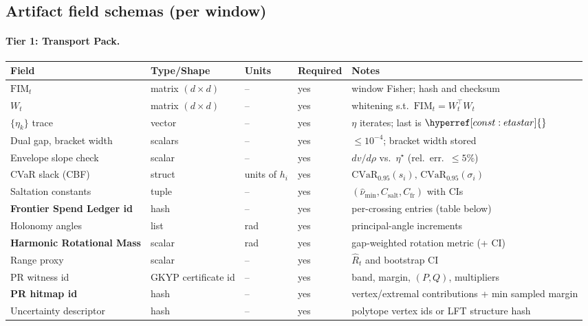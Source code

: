 \documentclass[10pt]{article}
\newcommand{\FIM}{\mathrm{FIM}}
\newcommand{\constref}[1]{\hyperref[const:#1]{\ensuremath{\csname constsym#1\endcsname}}}
\begin{document}
\subsection{Artifact field schemas (per window)}\label{app:artifact-schemas}

\paragraph{Tier 1: Transport Pack.}
\begin{center}
\renewcommand{\arraystretch}{1.12}
\begin{tabularx}{\textwidth}{@{} l l l X X @{}}
\toprule
\textbf{Field} & \textbf{Type/Shape} & \textbf{Units} & \textbf{Required} & \textbf{Notes} \\
\midrule
$\FIM_t$ & matrix $(d\times d)$ & – & yes & window Fisher; hash and checksum \\
$W_t$ & matrix $(d\times d)$ & – & yes & whitening s.t.\ $\FIM_t=W_t^\top W_t$ \\
$\{\eta_k\}$ trace & vector & – & yes & $\eta$ iterates; last is $\constref{etastar}$ \\
Dual gap, bracket width & scalars & – & yes & $\le 10^{-4}$; bracket width stored \\
Envelope slope check & scalar & – & yes & $dv/d\rho$ vs.\ $\eta^\star$ (rel.\ err.\ $\le 5\%$) \\
CVaR slack (CBF) & struct & units of $h_i$ & yes & $\mathrm{CVaR}_{0.95}(s_i),\,\mathrm{CVaR}_{0.95}(\sigma_i)$ \\
Saltation constants & tuple & – & yes & $(\hat\nu_{\min},C_{\mathrm{salt}},C_{\mathrm{fr}})$ with CIs \\
\textbf{Frontier Spend Ledger id} & hash & – & yes & per-crossing entries (table below) \\
Holonomy angles & list & rad & yes & principal-angle increments \\
\textbf{Harmonic Rotational Mass} & scalar & rad & yes & gap-weighted rotation metric (+ CI) \\
Range proxy & scalar & – & yes & $\widehat R_t$ and bootstrap CI \\
PR witness id & GKYP certificate id & – & yes & band, margin, $(P,Q)$, multipliers \\
\textbf{PR hitmap id} & hash & – & yes & vertex/extremal contributions + min sampled margin \\
Uncertainty descriptor & hash & – & yes & polytope vertex ids or LFT structure hash \\

\end{tabularx}
\end{center}
\end{document}
